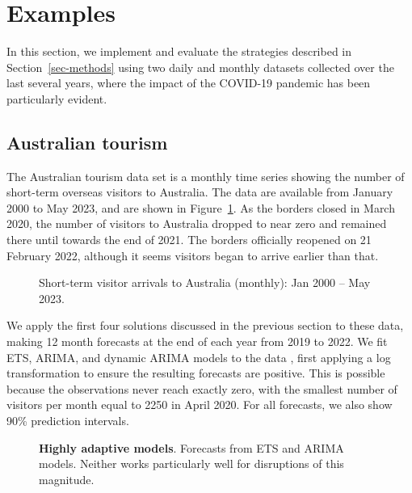 \documentclass[
  11pt,
  a4paper,
]{article}
\begin{document}
\section{Examples}\label{sec-examples}

In this section, we implement and evaluate the strategies described in
Section~\ref{sec-methods} using two daily and monthly datasets collected
over the last several years, where the impact of the COVID-19 pandemic
has been particularly evident.

\subsection{Australian tourism}\label{sec-tourism}

The Australian tourism data set is a monthly time series showing the
number of short-term overseas visitors to Australia. The data
\autocite{tourismdata} are available from January 2000 to May 2023, and
are shown in Figure~\ref{fig-tourism-plot1}. As the borders closed in
March 2020, the number of visitors to Australia dropped to near zero and
remained there until towards the end of 2021. The borders officially
reopened on 21 February 2022, although it seems visitors began to arrive
earlier than that.

\begin{figure}


\caption{\label{fig-tourism-plot1}Short-term visitor arrivals to
Australia (monthly): Jan 2000 -- May 2023.}

\end{figure}%

We apply the first four solutions discussed in the previous section to
these data, making 12 month forecasts at the end of each year from 2019
to 2022. We fit ETS, ARIMA, and dynamic ARIMA models to the data
\autocite{fpp3}, first applying a log transformation to ensure the
resulting forecasts are positive. This is possible because the
observations never reach exactly zero, with the smallest number of
visitors per month equal to 2250 in April 2020. For all forecasts, we
also show 90\% prediction intervals.

\begin{figure}[!b]


\caption{\label{fig-tsol1-plot}\textbf{Highly adaptive models}.
Forecasts from ETS and ARIMA models. Neither works particularly well for
disruptions of this magnitude.}

\end{figure}%
\end{document}
